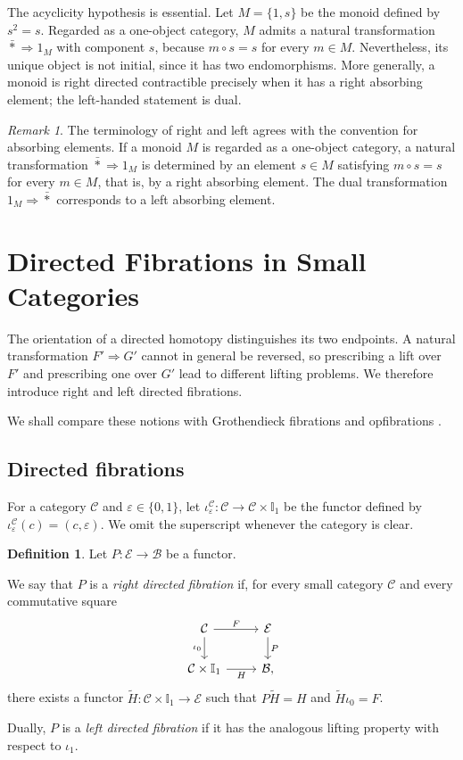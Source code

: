 \documentclass[12pt]{amsart}
\theoremstyle{definition}
\newtheorem{definition}[teo]{Definition}
\theoremstyle{remark}
\newtheorem{remark}{Remark}
\numberwithin{figure}{section}%
\newcommand{\Ba}{\mathcal{B}}
\newcommand{\CC}{\mathcal{C}}
\newcommand{\E}{\mathcal{E}}
\begin{document}
The acyclicity hypothesis is essential. Let \(M=\{1,s\}\) be the monoid
defined by \(s^2=s\). Regarded as a one-object category, \(M\) admits a
natural transformation \(\bar{\ast}\Rightarrow1_M\) with component \(s\),
because \(m\circ s=s\) for every \(m\in M\). Nevertheless, its unique object
is not initial, since it has two endomorphisms. More generally, a monoid is
right directed contractible precisely when it has a right absorbing element;
the left-handed statement is dual.


\begin{remark}
The terminology of right and left agrees with the convention for absorbing elements. If a monoid \(M\) is regarded as a one-object category, a natural transformation \(\bar{\ast}\Rightarrow1_M\) is determined by an element \(s\in M\) satisfying \(m\circ s=s\) for every \(m\in M\), that is, by a right absorbing element. The dual transformation \(1_M\Rightarrow\bar{\ast}\) corresponds to a left absorbing element.
\end{remark}

\section{Directed Fibrations in Small Categories}\label{sec:directed_fibrations}

The orientation of a directed homotopy distinguishes its two endpoints. A
natural transformation \(F'\Rightarrow G'\) cannot in general be reversed,
so prescribing a lift over \(F'\) and prescribing one over \(G'\) lead to
different lifting problems. We therefore introduce right and left directed
fibrations.

We shall compare these notions with Grothendieck fibrations and
opfibrations
\cite{RosoliniGrothendieckFibrations,RiehlLoregianFibration,Varadarajan}.

\subsection{Directed fibrations}

For a category \(\CC\) and \(\varepsilon\in\{0,1\}\), let
\(\iota_\varepsilon^\CC\colon\CC\to\CC\times\mathbb{I}_1\) be the functor
defined by \(\iota_\varepsilon^\CC(c)=(c,\varepsilon)\). We omit the
superscript whenever the category is clear.

\begin{definition}\label{def:directed_fibration}
Let \(P\colon\E\to\Ba\) be a functor.

We say that \(P\) is a \emph{right directed fibration} if, for every small
category \(\CC\) and every commutative square
\[
\begin{tikzcd}
\CC \arrow[r, "F"] \arrow[d, "\iota_0"'] &
\E \arrow[d, "P"] \\
\CC\times\mathbb{I}_1 \arrow[r, "H"'] &
\Ba ,
\end{tikzcd}
\]
there exists a functor
\(\widetilde H\colon\CC\times\mathbb{I}_1\to\E\) such that
\(P\widetilde H=H\) and \(\widetilde H\iota_0=F\).

Dually, \(P\) is a \emph{left directed fibration} if it has the analogous
lifting property with respect to \(\iota_1\).
\end{definition}
\end{document}
